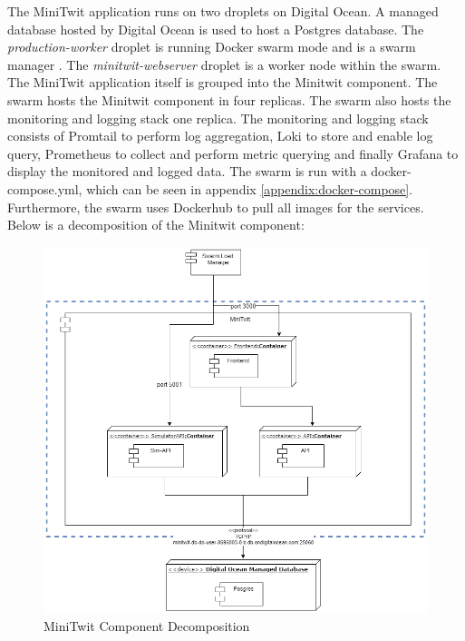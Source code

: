 The MiniTwit application runs on two droplets on Digital Ocean. A managed database hosted by Digital Ocean is used to host a Postgres database. The \textit{production-worker} droplet is running Docker swarm mode and is a swarm manager \cite{docker-swarm}. The \textit{minitwit-webserver} droplet is a worker node within the swarm. The MiniTwit application itself is grouped into the Minitwit component. The swarm hosts the Minitwit component in four replicas. The swarm also hosts the monitoring and logging stack one replica. The monitoring and logging stack consists of Promtail to perform log aggregation, Loki to store and enable log query, Prometheus to collect and perform metric querying and finally Grafana to display the monitored and logged data. The swarm is run with a docker-compose.yml, which can be seen in appendix \ref{appendix:docker-compose}. \\
Furthermore, the swarm uses Dockerhub to pull all images for the services.
\\
Below is a decomposition of the Minitwit component:

\begin{figure}[h!]
    \centering
    \includegraphics[width=1.1\linewidth]{report/images/minitwit-decomposition.png}
    \caption{MiniTwit Component Decomposition}
    \label{fig:arcitechture-overview}
\end{figure}

